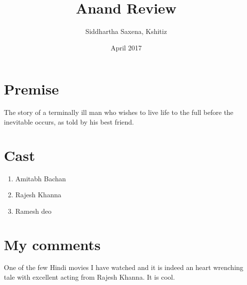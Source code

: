 \documentclass{article}
\title{Anand Review}
\author{Siddhartha Saxena, Kshitiz}
\date{April 2017}
\begin{document}
\maketitle
\section{Premise}
The story of a terminally ill man who wishes to live life to the full before the inevitable occurs, as told by his best friend.
\section{Cast}
\begin{enumerate}
	\item Amitabh Bachan
	\item Rajesh Khanna
	\item Ramesh deo
\end{enumerate}	
\section{My comments}
One of the few Hindi movies I have watched and it is indeed an heart wrenching tale with excellent acting from Rajesh Khanna.
It is cool.
\end{document}

